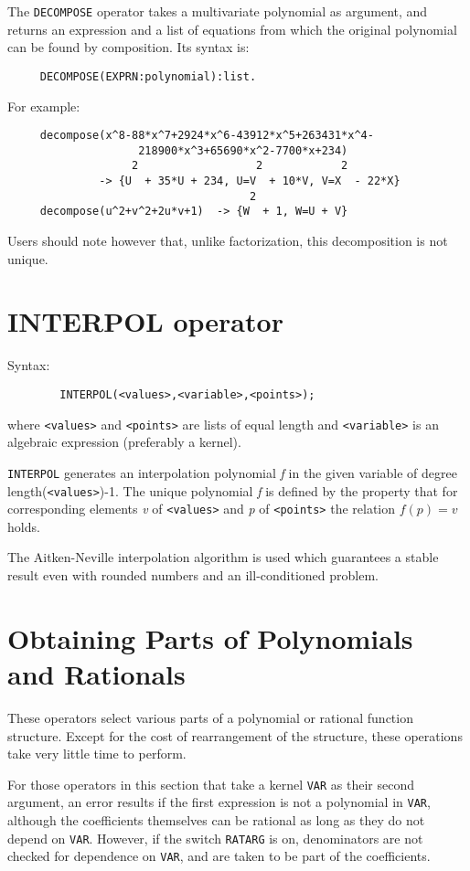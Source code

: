 The {\tt DECOMPOSE} operator takes a multivariate polynomial as argument,
and returns an expression and a list of equations from which the
original polynomial can be found by composition.  Its syntax is:
\begin{verbatim}
     DECOMPOSE(EXPRN:polynomial):list.
\end{verbatim}
For example:
\begin{verbatim}
     decompose(x^8-88*x^7+2924*x^6-43912*x^5+263431*x^4-
                    218900*x^3+65690*x^2-7700*x+234)
                   2                  2            2
              -> {U  + 35*U + 234, U=V  + 10*V, V=X  - 22*X}
                                     2
     decompose(u^2+v^2+2u*v+1)  -> {W  + 1, W=U + V}
\end{verbatim}
Users should note however that, unlike factorization, this decomposition
is not unique.

\section{INTERPOL operator}

Syntax:
\begin{verbatim}
        INTERPOL(<values>,<variable>,<points>);
\end{verbatim}

where {\tt <values>} and {\tt <points>} are lists of equal length and
{\tt <variable>} is an algebraic expression (preferably a kernel).

{\tt INTERPOL} generates an interpolation polynomial {\em f\/} in the given
variable of degree length({\tt <values>})-1.  The unique polynomial {\em f\/}
is defined by the property that for corresponding elements {\em v\/} of
{\tt <values>} and {\em p\/} of {\tt <points>} the relation $f(p)=v$ holds.

The Aitken-Neville interpolation algorithm is used which guarantees a
stable result even with rounded numbers and an ill-conditioned problem.

\section{Obtaining Parts of Polynomials and Rationals}

These operators select various parts of a polynomial or rational function
structure. Except for the cost of rearrangement of the structure, these
operations take very little time to perform.

For those operators in this section that take a kernel {\tt VAR} as their
second argument, an error results if the first expression is not a
polynomial in {\tt VAR}, although the coefficients themselves can be
rational as long as they do not depend on {\tt VAR}.  However, if the
switch {\tt RATARG} is on, denominators are not checked
for dependence on {\tt VAR}, and are taken to be part of the coefficients.

